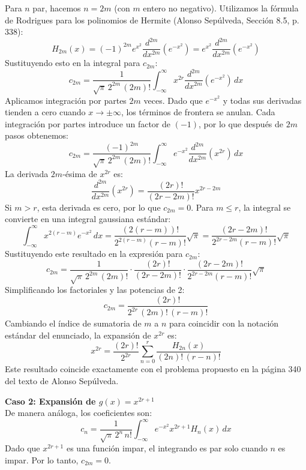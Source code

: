 \documentclass[a4paper]{article}
\begin{document}
Para $n$ par, hacemos $n = 2m$ (con $m$ entero no negativo). Utilizamos la fórmula de Rodrigues para los polinomios de Hermite (Alonso Sepúlveda, Sección 8.5, p. 338):
$$
H_{2m}(x) = (-1)^{2m} e^{x^2} \frac{d^{2m}}{dx^{2m}} \left( e^{-x^2} \right) = e^{x^2} \frac{d^{2m}}{dx^{2m}} \left( e^{-x^2} \right)
$$
Sustituyendo esto en la integral para $c_{2m}$:
$$
c_{2m} = \frac{1}{\sqrt{\pi} \, 2^{2m} \, (2m)!} \int_{-\infty}^{\infty} x^{2r} \frac{d^{2m}}{dx^{2m}} \left( e^{-x^2} \right) \, dx
$$
Aplicamos integración por partes $2m$ veces. Dado que $e^{-x^2}$ y todas sus derivadas tienden a cero cuando $x \to \pm \infty$, los términos de frontera se anulan. Cada integración por partes introduce un factor de $(-1)$, por lo que después de $2m$ pasos obtenemos:
$$
c_{2m} = \frac{(-1)^{2m}}{\sqrt{\pi} \, 2^{2m} \, (2m)!} \int_{-\infty}^{\infty} e^{-x^2} \frac{d^{2m}}{dx^{2m}} \left( x^{2r} \right) \, dx
$$
La derivada $2m$-ésima de $x^{2r}$ es:
$$
\frac{d^{2m}}{dx^{2m}} \left( x^{2r} \right) = \frac{(2r)!}{(2r-2m)!} x^{2r-2m}
$$
Si $m > r$, esta derivada es cero, por lo que $c_{2m} = 0$. Para $m \leq r$, la integral se convierte en una integral gaussiana estándar:
$$
\int_{-\infty}^{\infty} x^{2(r-m)} e^{-x^2} \, dx = \frac{(2(r-m))!}{2^{2(r-m)} (r-m)!} \sqrt{\pi} = \frac{(2r-2m)!}{2^{2r-2m} (r-m)!} \sqrt{\pi}
$$
Sustituyendo este resultado en la expresión para $c_{2m}$:
$$
c_{2m} = \frac{1}{\sqrt{\pi} \, 2^{2m} \, (2m)!} \cdot \frac{(2r)!}{(2r-2m)!} \cdot \frac{(2r-2m)!}{2^{2r-2m} (r-m)!} \sqrt{\pi}
$$
Simplificando los factoriales y las potencias de 2:
$$
c_{2m} = \frac{(2r)!}{2^{2r} \, (2m)! \, (r-m)!}
$$
Cambiando el índice de sumatoria de $m$ a $n$ para coincidir con la notación estándar del enunciado, la expansión de $x^{2r}$ es:
$$
x^{2r} = \frac{(2r)!}{2^{2r}} \sum_{n=0}^{r} \frac{H_{2n}(x)}{(2n)! \, (r-n)!}
$$
Este resultado coincide exactamente con el problema propuesto en la página 340 del texto de Alonso Sepúlveda.

\vspace{0.3cm}
\noindent\textbf{Caso 2: Expansión de $g(x) = x^{2r+1}$} \\
De manera análoga, los coeficientes son:
$$
c_n = \frac{1}{\sqrt{\pi} \, 2^n \, n!} \int_{-\infty}^{\infty} e^{-x^2} x^{2r+1} H_n(x) \, dx
$$
Dado que $x^{2r+1}$ es una función impar, el integrando es par solo cuando $n$ es impar. Por lo tanto, $c_{2m} = 0$. 
\end{document}
